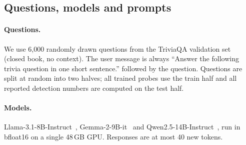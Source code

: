 \subsection{Questions, models and prompts}

\paragraph{Questions.} We use 6{,}000 randomly drawn questions from the TriviaQA validation set~\citep{joshi2017triviaqa} (closed book, no context). The user message is always ``Answer the following trivia question in one short sentence.'' followed by the question. Questions are split at random into two halves; all trained probes use the train half and all reported detection numbers are computed on the test half.

\paragraph{Models.} Llama-3.1-8B-Instruct~\citep{grattafiori2024llama3}, Gemma-2-9B-it~\citep{gemmateam2024gemma2} and Qwen2.5-14B-Instruct~\citep{qwen2024qwen25}, run in bfloat16 on a single 48\,GB GPU. Responses are at most 40 new tokens.

